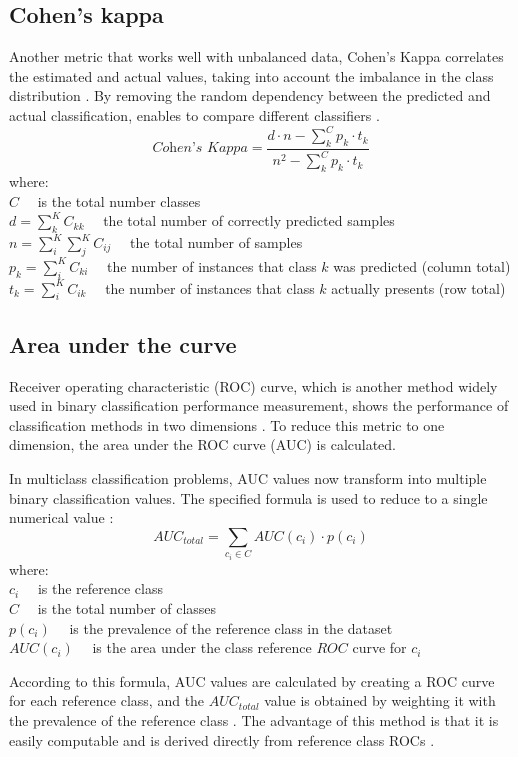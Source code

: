 \subsection{Cohen's kappa}
Another metric that works well with unbalanced data, Cohen's Kappa correlates the estimated and actual values, taking into account the imbalance in the class distribution \cite{maaritwidmannalfredoroccato2021}. By removing the random dependency between the predicted and actual classification, enables to compare different classifiers \cite{grandini2020metrics}. 
\begin{equation}
\textit{Cohen's Kappa} = \displaystyle\frac{d \cdot n-\displaystyle\sum_{k}^{C} p_{k} \cdot t_{k}}{n^{2}-\displaystyle\sum_{k}^{C} p_{k} \cdot t_{k}}
\label{kappa}	
\end{equation}
where:\\
$C\quad$ is the total number classes\\
$d=\displaystyle\sum_{k}^{K} C_{k k} \quad$ the total number of correctly predicted samples\\
$n=\displaystyle\sum_{i}^{K} \displaystyle\sum_{j}^{K} C_{i j}\quad$ the total number of samples\\
$p_{k}=\displaystyle\sum_{i}^{K} C_{k i}\quad$ the number of instances that class $k$ was predicted (column total)\\
$t_{k}=\displaystyle\sum_{i}^{K} C_{i k}\quad$ the number of instances that class $k$ actually presents (row total)

\subsection{Area under the curve}
Receiver operating characteristic (ROC) curve, which is another method widely used in binary classification performance measurement, shows the performance of classification methods in two dimensions \cite{fawcett2004roc}. To reduce this metric to one dimension, the area under the ROC curve (AUC) is calculated.

In multiclass classification problems, AUC values now transform into multiple binary classification values. The specified formula is used to reduce to a single numerical value \cite{fawcett2004roc}:
\begin{equation}
\textit{AUC}_{total} = \displaystyle\sum_{c_{i} \in C} AUC(c_{i}) \cdot p(c_{i})
\label{auc}
\end{equation}
where:\\
$c_{i} \quad$ is the reference class \\
$C \quad$ is the total number of classes\\
$p(c_i) \quad$ is the prevalence of the reference class in the dataset\\
$AUC(c_{i}) \quad$ is the area under the class reference $ROC$ curve for $c_{i}$

According to this formula, AUC values are calculated by creating a ROC curve for each reference class, and the $AUC_{total}$ value is obtained by weighting it with the prevalence of the reference class \cite{fawcett2004roc,he2009learning}. The advantage of this method is that it is easily computable and is derived directly from reference class ROCs \cite{fawcett2004roc}.